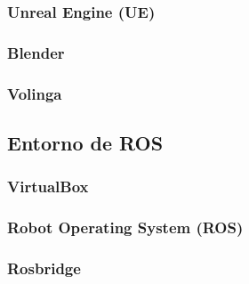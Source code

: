 \documentclass[a4paper, 12pt, spanish, twoside]{article}
\begin{document}
\subsubsection{Unreal Engine (UE)} \label{sec:herramientas:motoresgraficos3d:ue}


\subsubsection{Blender} \label{sec:herramientas:motoresgraficos3d:blender}


\subsubsection{Volinga} \label{sec:herramientas:motoresgraficos3d:volinga}



\subsection{Entorno de ROS} \label{sec:herramientas:entornoros}

\subsubsection{VirtualBox} \label{sec:herramientas:entornoros:virtualbox}


\subsubsection{Robot Operating System (ROS)} \label{sec:herramientas:entornoros:ros}


\subsubsection{Rosbridge} \label{sec:herramientas:entornoros:rosbridge}
\end{document}
